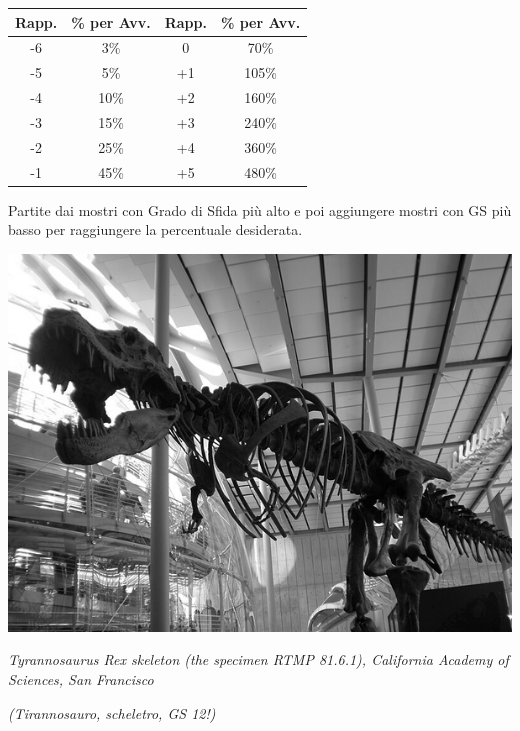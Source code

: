 \begin{multicols}{2}
\begin{enumerate}[leftmargin=*]
\noindent\begin{tabularx}{0.95\linewidth}{c|c|c|c}
\textbf{Rapp.} & \textbf{\% per Avv.} &\textbf{Rapp.} & \textbf{\% per Avv.}\\
\toprule
-6 & 3\% &  0 & 70\% \\
-5 & 5\% & +1 & 105\% \\
-4 & 10\% & +2 & 160\% \\
-3 & 15\% & +3 & 240\% \\
-2 & 25\% & +4 & 360\% \\
-1 & 45\% & +5 & 480\% \\
\end{tabularx}

Partite dai mostri con Grado di Sfida più alto e poi aggiungere mostri con GS più basso per raggiungere la percentuale desiderata.

\end{enumerate}

\end{multicols}

\vfill

\begin{center}
\includegraphics[width=0.6\linewidth]{immagini/trex.png}

\emph{Tyrannosaurus Rex skeleton (the specimen RTMP 81.6.1), California Academy of Sciences, San Francisco}

\emph{(Tirannosauro, scheletro, GS 12!)}
\end{center}




\pagebreak

